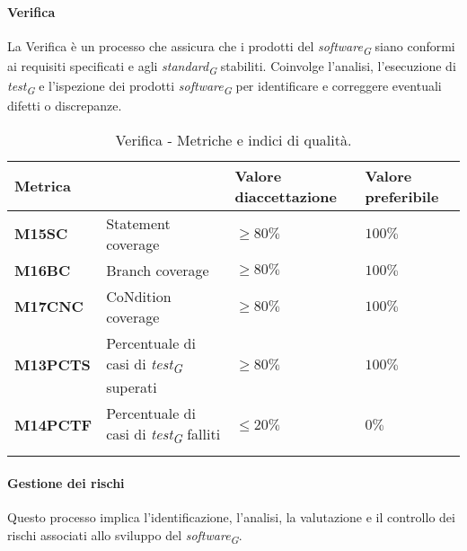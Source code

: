 \vspace{0.5cm}

\paragraph{Verifica}
La Verifica è un processo che assicura che i prodotti del \textit{software}\textsubscript{\textit{G}} siano conformi ai requisiti specificati e agli \textit{standard}\textsubscript{\textit{G}} stabiliti. Coinvolge l'analisi, l'esecuzione di \textit{test}\textsubscript{\textit{G}} e l'ispezione dei prodotti \textit{software}\textsubscript{\textit{G}} per identificare e correggere eventuali difetti o discrepanze.

\vspace{0.4cm}

\begin{longtable}{|C{1.9cm}|L{4cm}|L{2.2cm}|L{2.1cm}|}
    \hline
    \textbf{Metrica} &  & \textbf{Valore di\linebreak accettazione} & {\textbf{Valore \linebreak preferibile}} \\
    \hline \hline

    \textbf{M15SC} & Statement coverage & $\geq 80\%$ & $100\%$ \\
    \hline

    \textbf{M16BC} & Branch coverage & $\geq 80\%$ & $100\%$ \\
    \hline

    \textbf{M17CNC} & CoNdition coverage & $\geq 80\%$ & $100\%$ \\
    \hline

    \textbf{M13PCTS} & Percentuale di casi di \textit{test}\textsubscript{\textit{G}} superati & $\geq 80\%$ & $100\%$ \\
    \hline

    \textbf{M14PCTF} & Percentuale di casi di \textit{test}\textsubscript{\textit{G}} falliti & $\leq 20\%$ & $0\%$ \\
    \hline

\caption{Verifica - Metriche e indici di qualità.}
\label{tab:metriche_verifica}
\end{longtable}

\vspace{0.5cm}

\paragraph{Gestione dei rischi}
Questo processo implica l'identificazione, l'analisi, la valutazione e il controllo dei rischi associati allo sviluppo del \textit{software}\textsubscript{\textit{G}}. 

